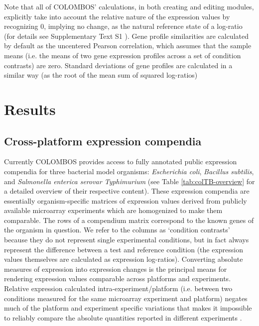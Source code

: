 Note that all of COLOMBOS' calculations, in both creating and editing modules, 
explicitly take into account the relative nature of the expression values by 
recognizing 0, implying no change, as the natural reference state of a 
log-ratio (for details see Supplementary Text S1 ). 
Gene profile similarities are calculated by default as the uncentered Pearson 
correlation, which assumes that the sample means (i.e. the means of two gene 
expression profiles across a set of condition contrasts) are zero. Standard 
deviations of gene profiles are calculated in a similar way (as the root of the 
mean sum of squared log-ratios)



\section{Results}

\subsection{Cross-platform expression compendia}\label{sec:colombos-comp}
Currently COLOMBOS provides access to fully annotated public expression 
compendia for three bacterial model organisms: {\it Escherichia coli}, {\it 
Bacillus subtilis}, and {\it Salmonella enterica serovar Typhimurium} (see 
Table \ref{tab:colTB-overview} for a detailed overview of their respective 
content). 
These expression compendia are essentially organism-specific matrices of 
expression values derived from publicly available microarray experiments which 
are homogenized to make them comparable. The rows of a compendium matrix 
correspond to the known genes of the organism in question. We refer to the 
columns as `condition contrasts' because they do not represent single 
experimental conditions, but in fact always represent the difference between a 
test and reference condition (the expression values themselves are calculated 
as expression log-ratios). Converting absolute measures of expression into 
expression changes is the principal means for rendering expression values 
comparable across platforms and experiments. Relative expression calculated 
intra-experiment/platform (i.e. between two conditions measured for the same 
microarray experiment and platform) negates much of the platform and experiment 
specific variations that makes it impossible to reliably compare the absolute 
quantities reported in different experiments \cite{Shi2006}.


